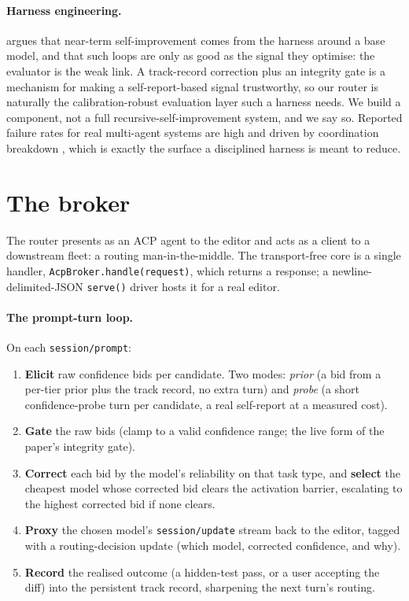 \documentclass[11pt]{article}
\newcommand{\code}[1]{\texttt{#1}}
\begin{document}
\paragraph{Harness engineering.} \citet{weng2026harness} argues that near-term self-improvement comes from the harness around a base model, and that such loops are only as good as the signal they optimise: the evaluator is the weak link. A track-record correction plus an integrity gate is a mechanism for making a self-report-based signal trustworthy, so our router is naturally the calibration-robust evaluation layer such a harness needs. We build a component, not a full recursive-self-improvement system, and we say so. Reported failure rates for real multi-agent systems are high and driven by coordination breakdown \citep{cemri2025multiagent}, which is exactly the surface a disciplined harness is meant to reduce.

\section{The broker}

The router presents as an ACP agent to the editor and acts as a client to a downstream fleet: a routing man-in-the-middle. The transport-free core is a single handler, \code{AcpBroker.handle(request)}, which returns a response; a newline-delimited-JSON \code{serve()} driver hosts it for a real editor.

\paragraph{The prompt-turn loop.} On each \code{session/prompt}:
\begin{enumerate}\itemsep2pt
\item \textbf{Elicit} raw confidence bids per candidate. Two modes: \emph{prior} (a bid from a per-tier prior plus the track record, no extra turn) and \emph{probe} (a short confidence-probe turn per candidate, a real self-report at a measured cost).
\item \textbf{Gate} the raw bids (clamp to a valid confidence range; the live form of the paper's integrity gate).
\item \textbf{Correct} each bid by the model's reliability on that task type, and \textbf{select} the cheapest model whose corrected bid clears the activation barrier, escalating to the highest corrected bid if none clears.
\item \textbf{Proxy} the chosen model's \code{session/update} stream back to the editor, tagged with a routing-decision update (which model, corrected confidence, and why).
\item \textbf{Record} the realised outcome (a hidden-test pass, or a user accepting the diff) into the persistent track record, sharpening the next turn's routing.
\end{enumerate}
\end{document}
